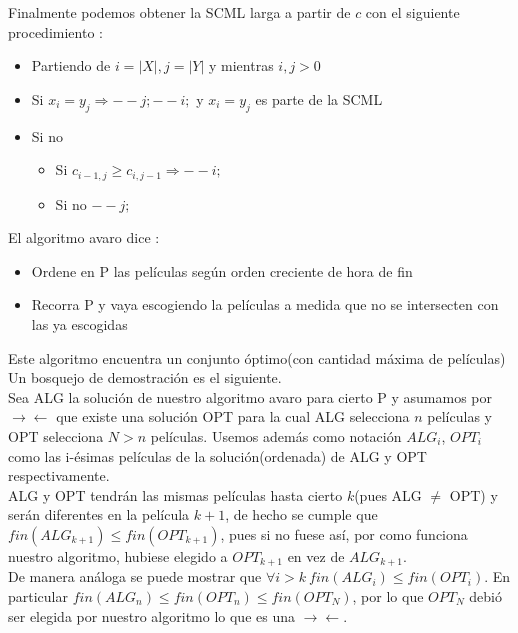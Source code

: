 \documentclass[dcc]{fcfmcourse}
\begin{document}
\begin{problems}
Finalmente podemos obtener la SCML larga a partir de $c$ con el siguiente procedimiento :
\begin{itemize}
\item Partiendo de $i = |X|, j = |Y|$ y mientras $i,j>0$
\item Si $x_{i} = y_{j} \Rightarrow --j;--i;$ y $x_{i}=y_{j}$ es parte de la SCML
\item Si no
\begin{itemize}
\item Si $c_{i-1,j}\geq c_{i,j-1} \Rightarrow --i;$
\item Si no $--j;$
\end{itemize}
\end{itemize}
\newpage
\problem El algoritmo avaro dice :
\begin{itemize}
\item Ordene en P las películas según orden creciente de hora de fin
\item Recorra P y vaya escogiendo la películas a medida que no se intersecten con las ya escogidas
\end{itemize}
Este algoritmo encuentra un conjunto óptimo(con cantidad máxima de películas)
Un bosquejo de demostración es el siguiente.\\
Sea ALG la solución de nuestro algoritmo avaro para cierto P y asumamos por $\to \gets$ que existe una solución OPT para la cual ALG selecciona $n$ películas y OPT selecciona $N>n$ películas. Usemos además como notación $ALG_{i}$, $OPT_{i}$ como las i-ésimas películas de la solución(ordenada) de ALG y OPT respectivamente.\\
ALG y OPT tendrán las mismas películas hasta cierto $k$(pues ALG $\neq$ OPT) y serán diferentes en la película $k+1$, de hecho se cumple que $fin(ALG_{k+1}) \leq fin(OPT_{k+1})$, pues si no fuese así, por como funciona nuestro algoritmo, hubiese elegido a $OPT_{k+1}$ en vez de $ALG_{k+1}$. \\
De manera análoga se puede mostrar que $\forall i > k\ fin(ALG_{i}) \leq fin(OPT_{i})$. En particular $fin(ALG_{n}) \leq fin(OPT_{n}) \leq fin(OPT_{N})$, por lo que $OPT_{N}$ debió ser elegida por nuestro algoritmo lo que es una $\to \gets$.

\end{problems}
\end{document}
